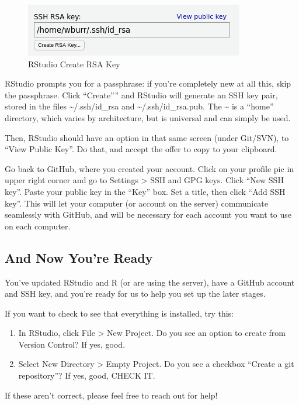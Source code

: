 \documentclass[
]{article}
\providecommand{\tightlist}{%
  \setlength{\itemsep}{0pt}\setlength{\parskip}{0pt}}
\begin{document}
\begin{figure}
\centering
\includegraphics{img/create_RSA.png?raw=true}
\caption{RStudio Create RSA Key}
\end{figure}

RStudio prompts you for a passphrase: if you're completely new at all
this, skip the passphrase. Click ``Create'''' and RStudio will generate
an SSH key pair, stored in the files \textasciitilde/.ssh/id\_rsa and
\textasciitilde/.ssh/id\_rsa.pub. The \textasciitilde{} is a ``home''
directory, which varies by architecture, but is universal and can simply
be used.

Then, RStudio should have an option in that same screen (under Git/SVN),
to ``View Public Key''. Do that, and accept the offer to copy to your
clipboard.

Go back to GitHub, where you created your account. Click on your profile
pic in upper right corner and go to Settings \textgreater{} SSH and GPG
keys. Click ``New SSH key''. Paste your public key in the ``Key'' box.
Set a title, then click ``Add SSH key''. This will let your computer (or
account on the server) communicate seamlessly with GitHub, and will be
necessary for each account you want to use on each computer.

\hypertarget{and-now-youre-ready}{%
\subsection{And Now You're Ready}\label{and-now-youre-ready}}

You've updated RStudio and R (or are using the server), have a GitHub
account and SSH key, and you're ready for us to help you set up the
later stages.

If you want to check to see that everything is installed, try this:

\begin{enumerate}
\def\labelenumi{\arabic{enumi}.}
\tightlist
\item
  In RStudio, click File \textgreater{} New Project. Do you see an
  option to create from Version Control? If yes, good.
\item
  Select New Directory \textgreater{} Empty Project. Do you see a
  checkbox ``Create a git repository''? If yes, good, CHECK IT.
\end{enumerate}

If these aren't correct, please feel free to reach out for help!
\end{document}
